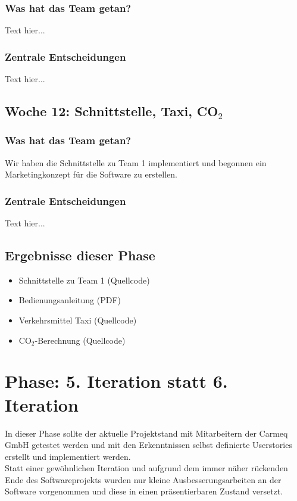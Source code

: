 \documentclass{article}
\begin{document}
\subsubsection{Was hat das Team getan?}

Text hier...

\subsubsection{Zentrale Entscheidungen}

Text hier...


\subsection{Woche 12: Schnittstelle, Taxi, CO$_2$}

\subsubsection{Was hat das Team getan?}

Wir haben die Schnittstelle zu Team 1 implementiert und begonnen ein Marketingkonzept f\"ur die Software zu erstellen.

\subsubsection{Zentrale Entscheidungen}

Text hier...

\subsection{Ergebnisse dieser Phase}

\begin{itemize}
\item Schnittstelle zu Team 1 (Quellcode)
\item Bedienungsanleitung (PDF)
\item Verkehrsmittel Taxi (Quellcode)
\item CO$_2$-Berechnung (Quellcode)
\end{itemize}

\section{Phase: 5. Iteration statt 6. Iteration}

In dieser Phase sollte der aktuelle Projektstand mit Mitarbeitern der Carmeq GmbH getestet werden und mit den Erkenntnissen selbst definierte Userstories erstellt und implementiert werden.\\
Statt einer gew\"ohnlichen Iteration und aufgrund dem immer n\"aher r\"uckenden Ende des Softwareprojekts wurden nur kleine Ausbesserungsarbeiten an der Software vorgenommen und diese in einen pr\"asentierbaren Zustand versetzt.
\end{document}
